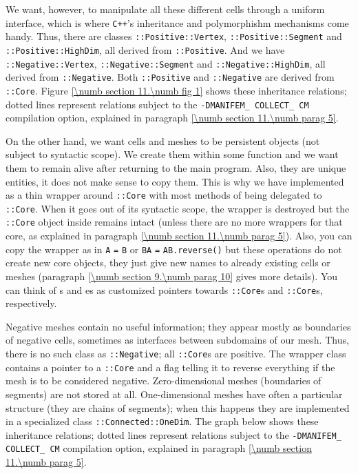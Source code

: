 We want, however, to manipulate all these different cells through a uniform interface,
which is where {\tt C++}'s inheritance and polymorphishm mechanisms come handy.
Thus, there are classes {\small\tt{}::Positive::Vertex},
{\small\tt{}::Positive::Segment} and {\small\tt{}::Positive::HighDim},
all derived from {\small\tt{}::Positive}.
And we have {\small\tt{}::Negative::Vertex},
{\small\tt{}::Negative::Segment} and {\small\tt{}::Negative::HighDim},
all derived from {\small\tt{}::Negative}.
Both {\small\tt{}::Positive} and {\small\tt{}::Negative} are derived from
{\small\tt{}::Core}.
Figure \ref{\numb section 11.\numb fig 1} shows these inheritance relations;
dotted lines represent relations subject to the {\small\tt -DMANIFEM\_\,COLLECT\_\,CM}
compilation option, explained in paragraph \ref{\numb section 11.\numb parag 5}.

On the other hand, we want cells and meshes to be persistent objects (not subject to
syntactic scope).
We create them within some function and we want them to remain alive after returning
to the main program.
Also, they are unique entities, it does not make sense to copy them.
This is why we have implemented {\small\tt{}} as a thin wrapper around
{\small\tt{}::Core}
with most methods of {\small\tt{}} being delegated to {\small\tt{}::Core}.
When it goes out of its syntactic scope, the wrapper is destroyed but the {\small\tt{}::Core}
object inside remains intact (unless there are no more wrappers for that core, as explained in
paragraph \ref{\numb section 11.\numb parag 5}).
Also, you can copy the wrapper as in {\small\tt{}} {\small\tt A} {\small\tt =}
{\small\tt B} or {\small\tt{}} {\small\tt BA} {\small\tt =} {\small\tt AB.reverse()}
but these operations do not create new core objects, they just give new names to
already existing cells or meshes (paragraph \ref{\numb section 9.\numb parag 10} gives
more details).
You can think of {\small\tt{}}s and {\small\tt{}}es as customized pointers towards
{\small\tt{}::Core}s and {\small\tt{}::Core}s, respectively.

Negative meshes contain no useful information; they appear mostly as boundaries
of negative cells, sometimes as interfaces between subdomains of our mesh.
Thus, there is no such class as {\small\tt{}::Negative};
all {\small\tt{}::Core}s are positive.
The wrapper class {\small\tt{}} contains a pointer to a {\small\tt{}::Core}
and a flag telling it to reverse everything if the mesh is to be considered negative.
Zero-dimensional meshes (boundaries of segments) are not stored at all.
One-dimensional meshes have often a particular structure (they are chains of segments);
when this happens they are implemented in a specialized class
{\small\tt{}::Connected::OneDim}.
The graph below shows these inheritance relations; dotted lines represent relations subject to
the {\small\tt -DMANIFEM\_\,COLLECT\_\,CM} compilation option, explained in paragraph
\ref{\numb section 11.\numb parag 5}.

